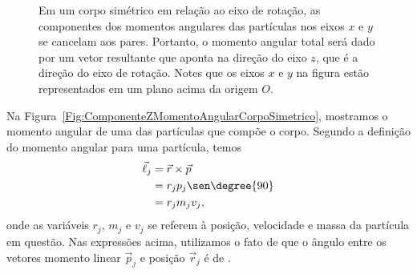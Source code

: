 \begin{figure}[!h]
\caption{Em um corpo simétrico em relação ao eixo de rotação,  as componentes dos momentos angulares das partículas nos eixos $x$ e $y$ se cancelam aos pares. Portanto, o momento angular total será dado por um vetor resultante que aponta na direção do eixo $z$, que é a direção do eixo de rotação. Notes que os eixos $x$ e $y$ na figura estão representados em um plano acima da origem $O$. \label{Fig:MomentoAngularCorpoSimetrico}}
\end{figure}

Na Figura~\ref{Fig:ComponenteZMomentoAngularCorpoSimetrico}, mostramos o momento angular de uma das partículas que compõe o corpo. Segundo a definição do momento angular para uma partícula, temos
\begin{align}
  \vec{\ell}_j &= \vec{r}\times\vec{p} \\
  &= r_j p_j \sen \degree{90} \\
  &= r_j m_j v_j, \label{Eq:MomAngPartJEixoZ}
\end{align}
%
onde as variáveis $r_j$, $m_j$ e $v_j$ se referem à posição, velocidade e massa da partícula em questão. Nas expressões acima, utilizamos o fato de que o ângulo entre os vetores momento linear $\vec{p}_j$ e posição $\vec{r}_j$ é de .

